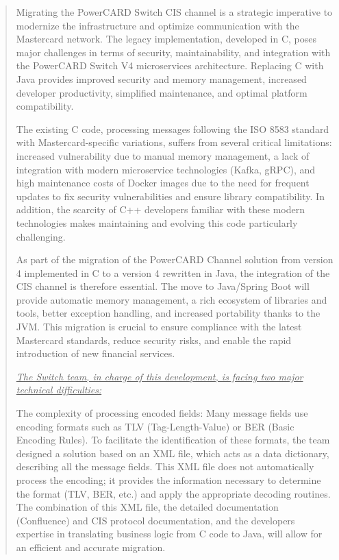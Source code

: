\documentclass[12pt,a4paper]{report}
\begin{document}
\begin{quote}
Migrating the PowerCARD Switch CIS channel is a strategic imperative to
modernize the infrastructure and optimize communication with the
Mastercard network. The legacy implementation, developed in C, poses
major challenges in terms of security, maintainability, and integration
with the PowerCARD Switch V4 microservices architecture. Replacing C
with Java provides improved security and memory management, increased
developer productivity, simplified maintenance, and optimal platform
compatibility.

The existing C code, processing messages following the ISO 8583 standard
with Mastercard-specific variations, suffers from several critical
limitations: increased vulnerability due to manual memory management, a
lack of integration with modern microservice technologies (Kafka, gRPC),
and high maintenance costs of Docker images due to the need for frequent
updates to fix security vulnerabilities and ensure library
compatibility. In addition, the scarcity of C++ developers familiar with
these modern technologies makes maintaining and evolving this code
particularly challenging.

As part of the migration of the PowerCARD Channel solution from version
4 implemented in C to a version 4 rewritten in Java, the integration of
the CIS channel is therefore essential. The move to Java/Spring Boot
will provide automatic memory management, a rich ecosystem of libraries
and tools, better exception handling, and increased portability thanks
to the JVM. This migration is crucial to ensure compliance with the
latest Mastercard standards, reduce security risks, and enable the rapid
introduction of new financial services.

\emph{\uline{The Switch team, in charge of this development, is facing
two major technical difficulties:}}

The complexity of processing encoded fields: Many message fields use
encoding formats such as TLV (Tag-Length-Value) or BER (Basic Encoding
Rules). To facilitate the identification of these formats, the team
designed a solution based on an XML file, which acts as a data
dictionary, describing all the message fields. This XML file does not
automatically process the encoding; it provides the information
necessary to determine the format (TLV, BER, etc.) and apply the
appropriate decoding routines. The combination of this XML file, the
detailed documentation (Confluence) and CIS protocol documentation, and
the developers\textquotesingle{} expertise in translating business logic
from C code to Java, will allow for an efficient and accurate migration.


\end{quote}
\end{document}
